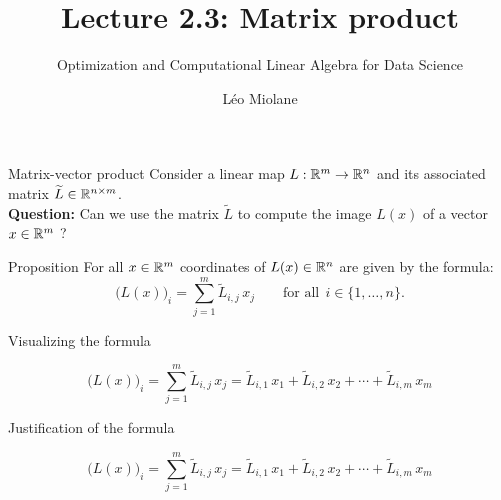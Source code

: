 \documentclass{beamer}
\title{Lecture 2.3: Matrix product}
\subtitle{Optimization and Computational Linear Algebra for Data Science}
\author{Léo Miolane}
\date{}
\begin{document}
\setcounter{showProgressBar}{0}
\setcounter{showSlideNumbers}{0}

\frame{\titlepage}


\setcounter{framenumber}{0}
\setcounter{showSlideNumbers}{1}

\begin{frame}[t]{Matrix-vector product}
	Consider a linear map $L:\mathbb{R}^m \to \mathbb{R}^n$ and its associated matrix $\widetilde{L} \in \mathbb{R}^{n \times m}$.
	\\
	\vspace{0.3cm}
	\textbf{Question:} Can we use the matrix $\widetilde{L}$ to compute the image $L(x)$ of a vector $x\in\mathbb{R}^m$ ?
	\vspace{0.3cm}

	\begin{block}{Proposition}
		For all $x\in\mathbb{R}^m$ coordinates of $L(x) \in \mathbb{R}^n$ are given by the formula:
		$$
		\big(L(x)\big)_i = \sum_{j=1}^m \widetilde{L}_{i,j} \, x_j \qquad \text{for all} \ \ i \in \{1, \dots, n\}.
		$$
	\end{block}
\end{frame}
\begin{frame}[t]{Visualizing the formula}
	\vspace{-0.9cm}
	\begin{exampleblock}{}
		\vspace{-0.4cm}
		$$
		\big(L(x)\big)_i = \sum_{j=1}^m \widetilde{L}_{i,j} \, x_j
		= \widetilde{L}_{i,1} \, x_1 + \widetilde{L}_{i,2} \, x_2 + \cdots + \widetilde{L}_{i,m} \, x_m
		$$
		\vspace{-0.4cm}
	\end{exampleblock}
\end{frame}
\begin{frame}[t]{Justification of the formula}
	\vspace{-0.9cm}
	\begin{exampleblock}{}
		\vspace{-0.4cm}
		$$
		\big(L(x)\big)_i = \sum_{j=1}^m \widetilde{L}_{i,j} \, x_j
		= \widetilde{L}_{i,1} \, x_1 + \widetilde{L}_{i,2} \, x_2 + \cdots + \widetilde{L}_{i,m} \, x_m
		$$
		\vspace{-0.4cm}
	\end{exampleblock}
\end{frame}
\end{document}
